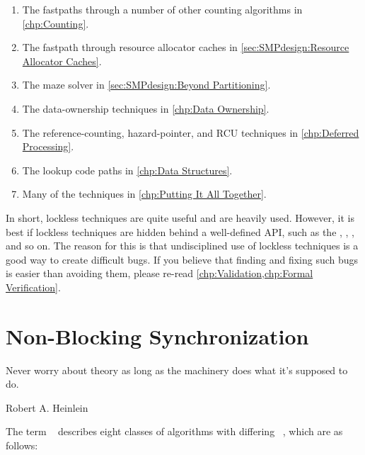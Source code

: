 \begin{enumerate}
\item	The fastpaths through a number of other counting algorithms
	in \cref{chp:Counting}.
\item	The fastpath through resource allocator caches in
	\cref{sec:SMPdesign:Resource Allocator Caches}.
\item	The maze solver in \cref{sec:SMPdesign:Beyond Partitioning}.
\item	The data-ownership techniques in \cref{chp:Data Ownership}.
\item	The reference-counting, hazard-pointer, and RCU techniques
	in \cref{chp:Deferred Processing}.
\item	The lookup code paths in \cref{chp:Data Structures}.
\item	Many of the techniques in \cref{chp:Putting It All Together}.
\end{enumerate}

In short, lockless techniques are quite useful and are heavily used.
However, it is best if lockless techniques are hidden behind a
well-defined API, such as the , ,
, and so on.
The reason for this is that undisciplined use of lockless techniques
is a good way to create difficult bugs.
If you believe that finding and fixing such bugs is easier than avoiding
them, please re-read
\cref{chp:Validation,chp:Formal Verification}.

\section{Non-Blocking Synchronization}
\label{sec:advsync:Non-Blocking Synchronization}
%
\epigraph{Never worry about theory as long as the machinery does what
	  it's supposed to do.}
	 {Robert A. Heinlein}

The term ~\cite{MauriceHerlihy90a}
describes eight classes of  algorithms with differing
\emph{}~\cite{DanAlitarh2013PracticalProgress},
which are as follows:

